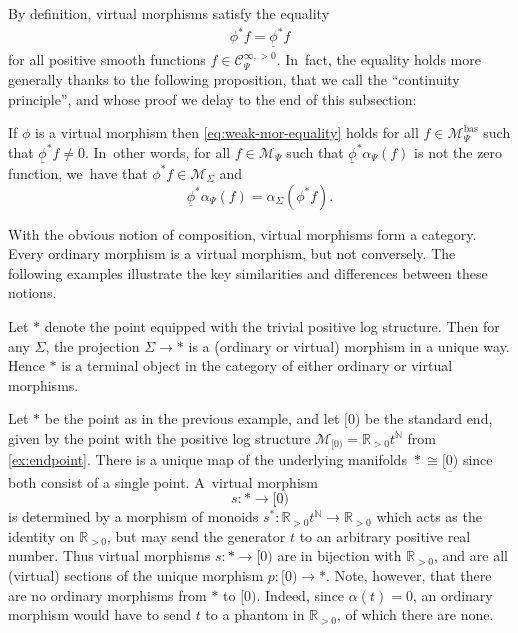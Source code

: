 \documentclass[10pt]{amsart}
\theoremstyle{definition}
\theoremstyle{remark}
\newenvironment{example}
  {\pushQED{\qed}\renewcommand{\qedsymbol}{$\lozenge$}\examplex}
  {\popQED\endexamplex}
\newcommand{\RR}{\mathbb{R}}
\newcommand{\NN}{\mathbb{N}}
\newcommand{\cM}{\mathscr{M}}
\newcommand{\cMbas}{\mathscr{M}^{\mathrm{bas}}}
\newcommand{\Cinfpos}[1]{\mathscr{C}^{\infty, > 0}_{#1}}
\newcommand{\Sig}{\Sigma}
\newcommand{\uphi}{\underline{\phi}}
\begin{document}
By definition, virtual morphisms satisfy the equality
\begin{align}
\phi^*f = \uphi^*f \label{eq:weak-mor-equality}
\end{align}
for all positive smooth functions $f \in \Cinfpos{\Psi}$. In~fact, the equality holds more generally thanks to the following proposition, that we call the ``continuity principle'', and whose proof we delay to the end of this subsection:

\begin{proposition}\label{prop:weak-mor-basic-sections}
If $\phi$ is a virtual morphism then \eqref{eq:weak-mor-equality} holds for all $f \in \cMbas_{\Psi}$ such that $\uphi^*f \neq 0$. In~other words, for all $f\in\cM_\Psi$ such that $\uphi^*\alpha_\Psi(f)$ is not the zero function, we~have that $\phi^*f\in \cM_\Sig$ and
\[
\uphi^*\alpha_\Psi(f) = \alpha_\Sig(\phi^*f).
\]
\end{proposition}

With the obvious notion of composition, virtual morphisms form a category. Every ordinary morphism is a virtual morphism, but not conversely. The following examples illustrate the key similarities and differences between these notions.

\begin{example}
Let $*$ denote the point equipped with the trivial positive log structure. Then for any $\Sig$, the projection $\Sig \to *$ is a (ordinary or virtual) morphism in a unique way. Hence $*$ is a terminal object in the category of either ordinary or virtual morphisms.
\end{example}

\begin{example}\label{ex:weak-mor-pt-to-end}
Let $*$ be the point as in the previous example, and let $[0)$ be the standard end, given by the point with the positive log structure $\cM_{[0)} = \RR_{>0}t^\NN$ from \autoref{ex:endpoint}. There is a unique map of the underlying manifolds $\underline{*}\cong\underline{[0)}$ since both consist of a single point. A~virtual morphism
\[
s\colon * \to [0)
\]
is determined by a morphism of monoids $s^*\colon\RR_{>0}t^\NN \to \RR_{>0}$ which acts as the identity on $\RR_{>0}$, but may send the generator $t$ to an arbitrary positive real number. Thus virtual morphisms $s\colon * \to [0)$ are in bijection with $\RR_{>0}$, and are all (virtual) sections of the unique morphism $p\colon [0)\to *$. Note, however, that there are no ordinary morphisms from $*$ to $[0)$. Indeed, since $\alpha(t)=0$, an ordinary morphism would have to send $t$ to a phantom in $\RR_{>0}$, of which there are none.
\end{example}
\end{document}
